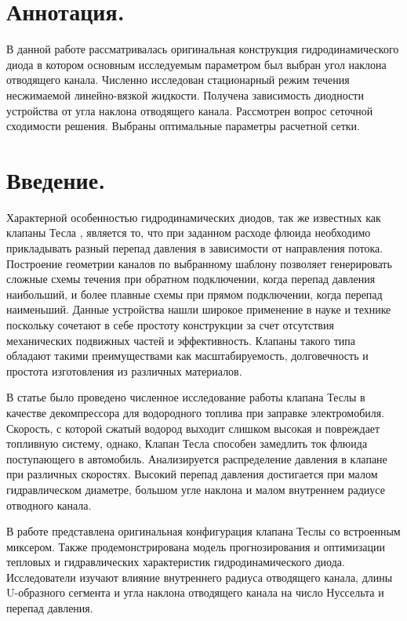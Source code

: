\documentclass[14pt,a4paper]{article}
\begin{document}
    
    \section*{Аннотация.}

        В данной работе рассматривалась оригинальная конструкция гидродинамического диода в котором основным исследуемым параметром был выбран угол наклона отводящего канала. Численно исследован стационарный режим течения несжимаемой линейно-вязкой жидкости. Получена зависимость диодности устройства от угла наклона отводящего канала. Рассмотрен вопрос сеточной сходимости решения. Выбраны оптимальные параметры расчетной сетки.

    \section*{Введение.}

        Характерной особенностью гидродинамических диодов, так же известных как клапаны Тесла \cite{TeslaValveReview}, является то, что при заданном расходе флюида необходимо прикладывать разный перепад давления в зависимости от направления потока. Построение геометрии каналов по выбранному шаблону позволяет генерировать сложные схемы течения при обратном подключении, когда перепад давления наибольший, и более плавные схемы при прямом подключении, когда перепад наименьший. Данные устройства нашли широкое применение в науке и технике поскольку сочетают в себе простоту конструкции за счет отсутствия механических подвижных частей и эффективность. Клапаны такого типа обладают такими преимуществами как масштабируемость, долговечность и простота изготовления из различных материалов.

        В статье \cite{JIN20188888} было проведено численное исследование работы клапана Теслы в качестве декомпрессора для водородного топлива при заправке электромобиля. Скорость, с которой сжатый водород выходит слишком высокая и повреждает топливную систему, однако, Клапан Тесла способен замедлить ток флюида поступающего в автомобиль. Анализируется распределение давления в клапане при различных скоростях. Высокий перепад давления достигается при малом гидравлическом диаметре, большом угле наклона и малом внутреннем радиусе отводного канала. 
        
        В работе \cite{DU2023103670} представлена оригинальная конфигурация клапана Теслы со встроенным миксером. Также продемонстрирована модель прогнозирования и оптимизации тепловых и гидравлических характеристик гидродинамического диода. Исследователи изучают влияние внутреннего радиуса отводящего канала, длины U-образного сегмента и угла наклона отводящего канала на число Нуссельта и перепад давления.
        
\end{document}
